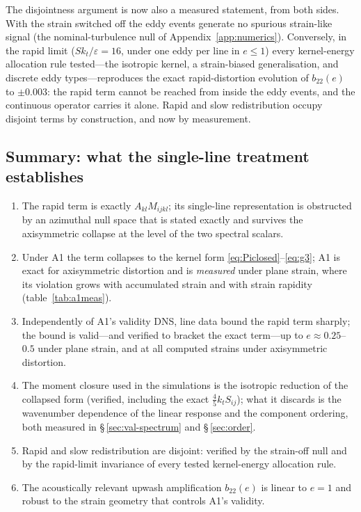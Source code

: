 \documentclass[lineno]{JFM-FLM_Au}
\begin{document}
The disjointness argument is now also a measured statement, from both
sides. With the strain switched off the eddy events generate no spurious
strain-like signal (the nominal-turbulence null of
Appendix~\ref{app:numerics}). Conversely, in the rapid limit
($Sk_t/\varepsilon=16$, under one eddy per line in $e\le1$) every
kernel-energy allocation rule tested---the isotropic kernel, a
strain-biased generalisation, and discrete eddy types---reproduces the
exact rapid-distortion evolution of $b_{22}(e)$ to $\pm0.003$: the rapid
term cannot be reached from inside the eddy events, and the continuous
operator carries it alone. Rapid and slow redistribution occupy disjoint
terms by construction, and now by measurement.

\subsection{Summary: what the single-line treatment establishes}
\label{sec:gate-summary}

\begin{enumerate}
\item The rapid term is exactly $A_{kl}M_{ijkl}$; its single-line
  representation is obstructed by an azimuthal null space that is stated
  exactly and survives the axisymmetric collapse at the level of the two
  spectral scalars.
\item Under A1 the term collapses to the kernel form
  \eqref{eq:Piclosed}--\eqref{eq:g3}; A1 is exact for axisymmetric
  distortion and is \emph{measured} under plane strain, where its violation
  grows with accumulated strain and with strain rapidity
  (table~\ref{tab:a1meas}).
\item Independently of A1's validity DNS, line data bound the rapid term
  sharply; the bound is valid---and verified to bracket the exact
  term---up to $e\approx0.25$--$0.5$ under plane strain, and at all
  computed strains under axisymmetric distortion.
\item The moment closure used in the simulations is the isotropic reduction
  of the collapsed form (verified, including the exact
  $\tfrac45k_tS_{ij}$); what it discards is the wavenumber dependence of
  the linear response and the component ordering, both measured in
  \S\,\ref{sec:val-spectrum} and \S\,\ref{sec:order}.
\item Rapid and slow redistribution are disjoint: verified by the
  strain-off null and by the rapid-limit invariance of every tested kernel-energy
  allocation rule.
\item The acoustically relevant upwash amplification $b_{22}(e)$ is linear
  to $e=1$ and robust to the strain geometry that controls A1's validity.
\end{enumerate}
\end{document}
